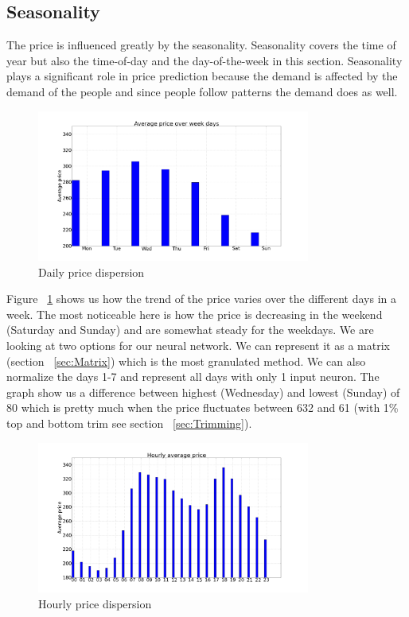 \subsection{Seasonality}\label{sec:seasonality}
The price is influenced greatly by the seasonality. Seasonality covers the time of year but also the time-of-day and the day-of-the-week in this section. Seasonality plays a significant role in price prediction because the demand is affected by the demand of the people and since people follow patterns the demand does as well.

\begin{figure}[H]
\centering
\includegraphics[width=0.8\textwidth ]{billeder/energy_price_plots/Average_price_over_weekdays.png}
\caption{Daily price dispersion}
\label{fig:price_over_weekdays}
\end{figure}

Figure ~\ref{fig:price_over_weekdays} shows us how the trend of the price varies over the different days in a week. The most noticeable here is how the price is decreasing in the weekend (Saturday and Sunday) and are somewhat steady for the weekdays. We are looking at two options for our neural network. We can represent it as a matrix (section ~\ref{sec:Matrix}) which is the most granulated method. We can also normalize the days 1-7 and represent all days with only 1 input neuron.
The graph show us a difference between highest (Wednesday) and lowest (Sunday) of 80 which is pretty much when the price fluctuates between 632 and 61 (with 1\% top and bottom trim see section ~\ref{sec:Trimming}).

\begin{figure}[H]
\centering
\includegraphics[width=0.8\textwidth ]{billeder/energy_price_plots/price_per_hour.png}
\caption{Hourly price dispersion}
\label{fig:price_per_hour}
\end{figure}

